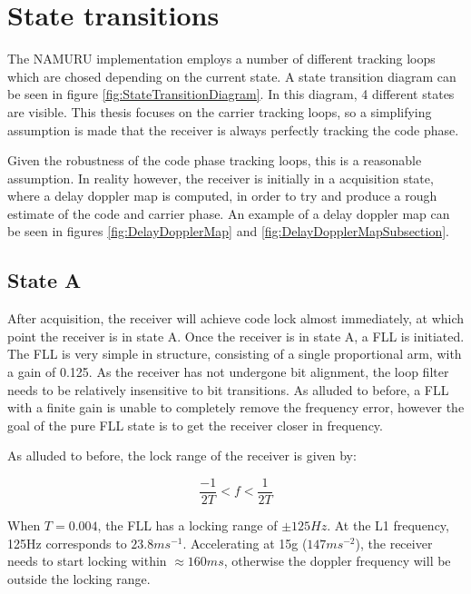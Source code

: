 \chapter{State transitions}
\label{ch:StateTransitions}




The \ac{NAMURU} implementation employs a number of different tracking loops which are chosed depending on the current state. A state transition diagram can be seen in figure \ref{fig:StateTransitionDiagram}. In this diagram, 4 different states are visible. This thesis focuses on the carrier tracking loops, so a simplifying assumption is made that the receiver is always perfectly tracking the code phase. 

Given the robustness of the code phase tracking loops, this is a reasonable assumption. In reality however, the receiver is initially in a acquisition state, where a delay doppler map is computed, in order to try and produce a rough estimate of the code and carrier phase.  An example of a delay doppler map can be seen in figures \ref{fig:DelayDopplerMap} and \ref{fig:DelayDopplerMapSubsection}.


\section{State A}
After acquisition, the receiver will achieve code lock almost immediately, at which point the receiver is in state A. Once the receiver is in state A, a FLL is initiated. The FLL is very simple in structure, consisting of a single proportional arm, with a gain of 0.125. As the receiver has not undergone bit alignment, the loop filter needs to be relatively insensitive to bit transitions. As alluded to before, a FLL with a finite gain is unable to completely remove the frequency error, however the goal of the pure FLL state is to get the receiver closer in frequency.

As alluded to before, the lock range of the receiver is given by:

\begin{equation}
\frac{-1}{2T} < f < \frac{1}{2T}
\end{equation}

When $T = 0.004$, the FLL has a locking range of $\pm 125Hz$. At the L1 frequency, 125Hz corresponds to $23.8ms^{-1}$. Accelerating at 15g ($147ms^{-2}$), the receiver needs to start locking within $\approx 160ms$, otherwise the doppler frequency will be outside the locking range.


